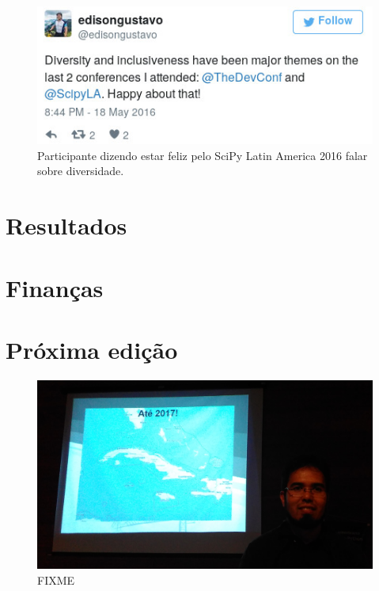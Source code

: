 \documentclass[12pt]{article}
\begin{document}
\begin{figure}[!htb]
\center
\includegraphics[height=.3\textheight]{tweet-diversidade.jpg}
\caption{Participante dizendo estar feliz pelo SciPy Latin America 2016 falar
sobre diversidade.}
\end{figure}

\clearpage
\newpage

\section*{Resultados}

\clearpage
\newpage

\section*{Finanças}

\clearpage
\newpage

\section*{Próxima edição}

\begin{figure}[!htb]
\center
\includegraphics[height=.3\textheight]{2017.jpg}
\caption{FIXME}
\end{figure}
\end{document}
